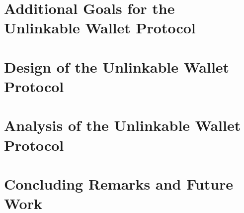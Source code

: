 \documentclass[12pt]{report}
\begin{document}
\chapter{Additional Goals for the Unlinkable Wallet Protocol}
\label{cha:unlinkable_goals}





\chapter{Design of the Unlinkable Wallet Protocol}
\label{cha:unlinkable_design}






\chapter{Analysis of the Unlinkable Wallet Protocol}
\label{cha:simulation}



%

\chapter{Concluding Remarks and Future Work}
\label{cha:conclusion}





\printindex

\begin{vita}

\end{vita}
\end{document}
